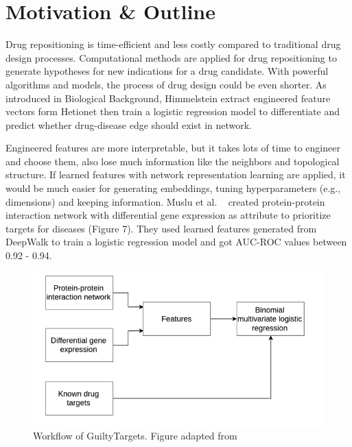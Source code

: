 \chapter{Motivation \& Outline}\label{motivation}

Drug repositioning is time-efficient and less costly compared to traditional drug design processes. Computational methods are applied for drug repositioning to generate hypotheses for new indications for a drug candidate. With powerful algorithms and models, the process of drug design could be even shorter. As introduced in Biological Background, Himmelstein extract engineered feature vectors form Hetionet then train a logistic regression model to differentiate and predict whether drug-disease edge should exist in network.

Engineered features are more interpretable, but it takes lots of time to engineer and choose them, also lose much information like the neighbors and topological structure. If learned features with network representation learning are applied, it would be much easier for generating embeddings, tuning hyperparameters (e.g., dimensions) and keeping information. Muslu et al. ~\cite{muslu_guiltytargets:_2019} created protein-protein interaction network with differential gene expression as attribute to prioritize targets for diseases (Figure 7). They used learned features generated from DeepWalk to train a logistic regression model and got AUC-ROC values between 0.92 - 0.94.

\begin{figure}[!ht]
    \centering
    \includegraphics[scale=0.3]
    {figures/guiltytargets.png}
    \captionsetup{justification=centering}
    \caption[Workflow of GuiltyTargets]{\label{fig:guiltytargets} Workflow of GuiltyTargets. Figure adapted from ~\cite{muslu_guiltytargets:_2019}}
\end{figure}

